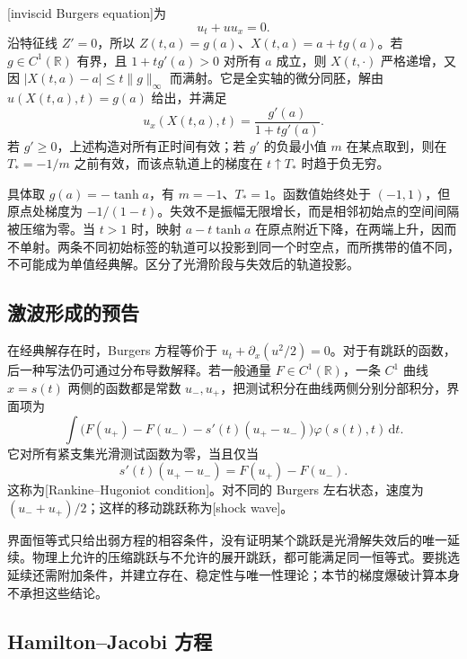 [inviscid Burgers equation]为
\[
 u_t+u u_x=0.
\]
沿特征线 \(Z'=0\)，所以 \(Z(t,a)=g(a)\)、\(X(t,a)=a+tg(a)\)。若 \(g\in C^1(\mathbb R)\) 有界，且 \(1+tg'(a)>0\) 对所有 \(a\) 成立，则 \(X(t,\cdot)\) 严格递增，又因 \(|X(t,a)-a|\leq t\|g\|_\infty\) 而满射。它是全实轴的微分同胚，解由 \(u(X(t,a),t)=g(a)\) 给出，并满足
\begin{equation}\label{b2:eq:07-burgers-gradient}
 u_x(X(t,a),t)=\frac{g'(a)}{1+tg'(a)}.
\end{equation}
若 \(g'\geq0\)，上述构造对所有正时间有效；若 \(g'\) 的负最小值 \(m\) 在某点取到，则在 \(T_*=-1/m\) 之前有效，而该点轨道上的梯度在 \(t\uparrow T_*\) 时趋于负无穷。

\ProseParagraphBreak

具体取 \(g(a)=-\tanh a\)，有 \(m=-1\)、\(T_*=1\)。函数值始终处于 \((-1,1)\)，但原点处梯度为 \(-1/(1-t)\)。失效不是振幅无限增长，而是相邻初始点的空间间隔被压缩为零。当 \(t>1\) 时，映射 \(a-t\tanh a\) 在原点附近下降，在两端上升，因而不单射。两条不同初始标签的轨道可以投影到同一个时空点，而所携带的值不同，不可能成为单值经典解。区分了光滑阶段与失效后的轨道投影。


\subsection{激波形成的预告}
\label{b2:subsec:070403}

在经典解存在时，Burgers 方程等价于
\(u_t+\partial_x(u^2/2)=0\)。对于有跳跃的函数，后一种写法仍可通过分布导数解释。若一般通量 \(F\in C^1(\mathbb R)\)，一条 \(C^1\) 曲线 \(x=s(t)\) 两侧的函数都是常数 \(u_-,u_+\)，把测试积分在曲线两侧分别分部积分，界面项为
\[
 \int \bigl(F(u_+)-F(u_-)-s'(t)(u_+-u_-)\bigr)
 \varphi(s(t),t)\,\mathrm dt.
\]
它对所有紧支集光滑测试函数为零，当且仅当
\[
 s'(t)(u_+-u_-)=F(u_+)-F(u_-).
\]
这称为[Rankine--Hugoniot condition]。对不同的 Burgers 左右状态，速度为 \((u_-+u_+)/2\)；这样的移动跳跃称为[shock wave]。

\ProseParagraphBreak

界面恒等式只给出弱方程的相容条件，没有证明某个跳跃是光滑解失效后的唯一延续。物理上允许的压缩跳跃与不允许的展开跳跃，都可能满足同一恒等式。要挑选延续还需附加条件，并建立存在、稳定性与唯一性理论；本节的梯度爆破计算本身不承担这些结论。

\subsection{Hamilton--Jacobi 方程}
\label{b2:subsec:070404}

